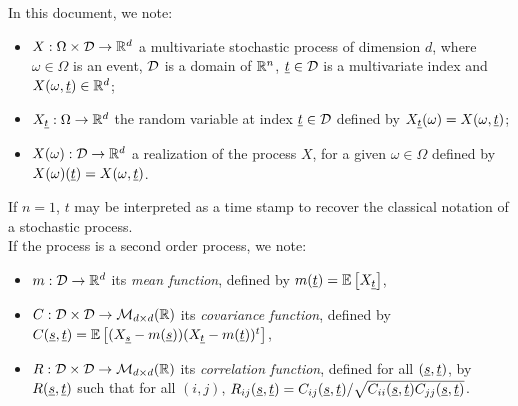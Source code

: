 \renewcommand{\filename}{docUC_StocProc_Intro.tex}
\renewcommand{\filetitle}{Some generalities on stochastic process}



In this document, we note:
\begin{itemize}
\item $X: \Omega \times{\mathcal D} \rightarrow {\mathbb R}^d$ a multivariate stochastic process of dimension $d$, where $\omega \in \Omega$ is an event, ${\mathcal D}$ is a domain of ${\mathbb R}^n$, ${\underline{t}}\in {\mathcal D}$ is a multivariate index and $X(\omega, {\underline{t}}) \in {\mathbb R}^d$;
\item  $X_{{\underline{t}}}: \Omega \rightarrow {\mathbb R}^d$ the random variable at index ${\underline{t}} \in {\mathcal D}$ defined by $X_{{\underline{t}}}(\omega)=X(\omega, {\underline{t}})$;
\item $X(\omega): {\mathcal D}  \rightarrow {\mathbb R}^d$ a realization of the process $X$, for a given $\omega \in \Omega$ defined by $X(\omega)({\underline{t}})=X(\omega, {\underline{t}})$.
\end{itemize}

If $n=1$, $t$ may be interpreted as a time stamp to recover the classical notation of a stochastic process.\\

If the process is a second order process, we note:
\begin{itemize}
\item  $m : {\mathcal D} \rightarrow  {\mathbb R}^d$ its \emph{mean function},  defined  by $m({\underline{t}})={\mathbb E}\left[ X_{{\underline{t}}} \right]$,
\item $C : {\mathcal D} \times {\mathcal D} \rightarrow  {\mathcal M}_{d \times d}({\mathbb R})$ its    \emph{covariance function},  defined  by $C({\underline{s}}, {\underline{t}})={\mathbb E}\left[ (X_{{\underline{s}}}-m({\underline{s}}))(X_{{\underline{t}}}-m({\underline{t}}))^t \right]$,
\item  $R : {\mathcal D} \times {\mathcal D} \rightarrow  \mathcal{M}_{d \times d}({\mathbb R})$ its \emph{ correlation function}, defined for all $({\underline{s}}, {\underline{t}})$, by $R({\underline{s}}, {\underline{t}})$ such that for all $(i,j)$, $R_{ij}({\underline{s}}, {\underline{t}})=C_{ij}({\underline{s}}, {\underline{t}})/\sqrt{C_{ii}({\underline{s}}, {\underline{t}})C_{jj}({\underline{s}}, {\underline{t}})}$.
\end{itemize}


